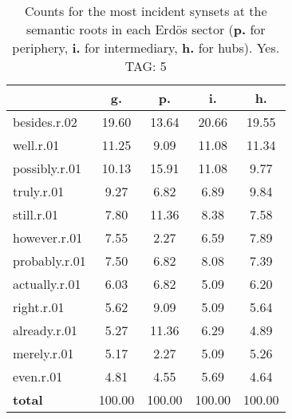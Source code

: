 \begin{table}[h!]
\begin{center}
\begin{tabular}{| l || c | c | c | c |}\hline
 & {\bf g.} & {\bf p.} & {\bf i.} & {\bf h.} \\\hline\hline
besides.r.02 & 19.60  & 13.64  & 20.66  & 19.55 \\\hline
well.r.01 & 11.25  & 9.09  & 11.08  & 11.34 \\\hline
possibly.r.01 & 10.13  & 15.91  & 11.08  & 9.77 \\\hline
truly.r.01 & 9.27  & 6.82  & 6.89  & 9.84 \\\hline
still.r.01 & 7.80  & 11.36  & 8.38  & 7.58 \\\hline
however.r.01 & 7.55  & 2.27  & 6.59  & 7.89 \\\hline
probably.r.01 & 7.50  & 6.82  & 8.08  & 7.39 \\\hline
actually.r.01 & 6.03  & 6.82  & 5.09  & 6.20 \\\hline
right.r.01 & 5.62  & 9.09  & 5.09  & 5.64 \\\hline
already.r.01 & 5.27  & 11.36  & 6.29  & 4.89 \\\hline
merely.r.01 & 5.17  & 2.27  & 5.09  & 5.26 \\\hline
even.r.01 & 4.81  & 4.55  & 5.69  & 4.64 \\\hline\hline
{{\bf total}} & 100.00  & 100.00  & 100.00  & 100.00 \\\hline
\end{tabular}
\caption{Counts for the most incident synsets at the semantic roots in each Erd\"os sector ({\bf p.} for periphery, {\bf i.} for intermediary, {\bf h.} for hubs). Yes. TAG: 5}
\end{center}
\end{table}